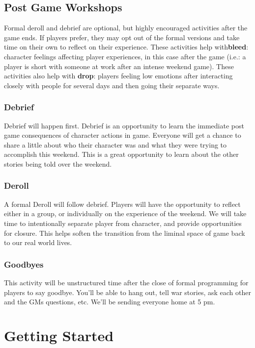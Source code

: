 \documentclass[sheet]{GL2020}
\begin{document}
\subsection{Post Game Workshops}
Formal deroll and debrief are optional, but highly encouraged activities after the game ends. If players prefer, they may opt out of the formal versions and take time on their own to reflect on their experience. These activities help with\textbf{bleed}: character feelings affecting player experiences, in this case after the game (i.e.: a player is short with someone at work after an intense weekend game). These activities also help with \textbf{drop}: players feeling low emotions after interacting closely with people for several days and then going their separate ways.

\subsubsection{Debrief} 
Debrief will happen first. Debrief is an opportunity to learn the immediate post game consequences of character actions in game. Everyone will get a chance to share a little about who their character was and what they were trying to accomplish this weekend. This is a great opportunity to learn about the other stories being told over the weekend.

\subsubsection{Deroll}
A formal Deroll will follow debrief. Players will have the opportunity to reflect either in a group, or individually on the experience of the weekend. We will take time to intentionally separate player from character, and provide opportunities for closure. This helps soften the transition from the liminal space of game back to our real world lives.

\subsubsection{Goodbyes}
This activity will be unstructured time after the close of formal programming for players to say goodbye. You’ll be able to hang out, tell war stories, ask each other and the GMs questions, etc. We’ll be sending everyone home at 5 pm.

\vfill

\clearpage
\section{Getting Started}
\end{document}
